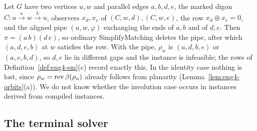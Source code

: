 \begin{remark}\label{rem:eng4-selfpipe}
Let $G$ have two vertices $u,w$ and parallel edges $a,b,d,e$, the marked
digon $C:u\xrightarrow{a}w\xrightarrow{b}u$, observers $x_d,x_e$ of
$(C,w,d),(C,w,e)$, the row $x_d\oplus x_e=0$, and the aligned pipe
$(u,w,\varphi)$ exchanging the ends of $a,b$ and of $d,e$. Then
$\pi=(a\,b)(d\,e)$, so ordinary SimplifyMatching deletes the pipe, after
which $(a,d,e,b)$ at $w$ satisfies the row. With the pipe, $\rho_w$ is
$(a,d,b,e)$ or $(a,e,b,d)$, so $d,e$ lie in different gaps and the instance
is infeasible; the rows of Definition~\ref{def:eng4-sm}(c) record exactly
this. In the identity case nothing is lost, since $\rho_w=\operatorname{rev}\beta(\rho_u)$
already follows from planarity (Lemma~\ref{lem:eng4-orbits}(a)). We do not
know whether the involution case occurs in instances derived from compiled
instances.
\end{remark}

\subsection{The terminal solver}\label{sec:eng4-terminal}

